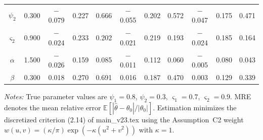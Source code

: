 \begin{table}[!h]
\begin{tabular}{ccccccccccc}
$\psi_2$ & 0.300 & $-$0.079 & 0.227 & 0.666 & $-$0.055 & 0.202 & 0.572 & $-$0.047 & 0.175 & 0.471 \\
$\varsigma_{2}$ & 0.900 & $-$0.024 & 0.233 & 0.202 & $-$0.021 & 0.219 & 0.193 & $-$0.024 & 0.185 & 0.164 \\
$\alpha$ & 1.500 & $-$0.026 & 0.159 & 0.085 & $-$0.011 & 0.112 & 0.060 & $-$0.005 & 0.080 & 0.043 \\
$\beta$ & 0.300 & 0.018 & 0.270 & 0.691 & 0.016 & 0.187 & 0.470 & 0.003 & 0.129 & 0.339 \\
\bottomrule
\end{tabular}
\begin{flushleft}
\footnotesize\textit{Notes:} True parameter values are $\psi_1 = 0.8$, $\psi_2 = 0.3$, $\varsigma_1 = 0.7$, $\varsigma_2 = 0.9$.  MRE denotes the mean relative error $\mathbb{E}[|\hat\theta - \theta_0|/|\theta_0|]$.  Estimation minimizes the discretized criterion (2.14) of main\_v23.tex using the Assumption~C2 weight $w(u,v)=(\kappa/\pi)\exp(-\kappa(u^2+v^2))$ with $\kappa=1$.
\end{flushleft}
\end{table}
